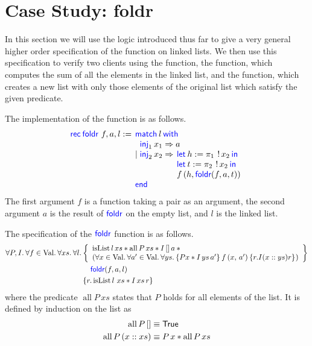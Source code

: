 \section{Case Study: foldr}
\label{sec:case-study:foldr}
In this section we will use the logic introduced thus far to give a very general higher order specification of the  function on linked lists.
We then use this specification to verify two clients using the  function, the  function, which computes the sum of all the elements in the linked list, and the  function, which creates a new list with only those elements of the original list which satisfy the given predicate.

The implementation of the  function is as follows.
\begin{displaymath}
  \Rec{\langkw{foldr}} f, a, l  =
  \MatchML{l}with{\Inj{1} x_1}=>{a}|{\Inj{2} x_2}=>{
    \begin{array}[t]{l} 
      \Let h = \Proj{1} \deref x_2 in\\
      \Let t = \Proj{2} \deref x_2 in\\
      f\, (h, \langkw{foldr} (f, a, t)) \end{array}}end{}
\end{displaymath}
The first argument $f$ is a function taking a pair as an argument, the second argument $a$ is the result of $\textsf{\color{blue} foldr}$ on the empty list, and $l$ is the linked list.

The specification of the $\textsf{\color{blue} foldr}$ function is as follows.
\begin{align*}
\All P, I. \All f \in \Val . \All xs. \All l. \hoareV[t]
{
  \begin{array}{l}
    \operatorname{isList} l\, xs \ast \operatorname{all} P\, xs \ast  I \, [] \, a \ast{}\\
    \left( \All x \in \Val. \All a' \in \Val. \All ys. \hoare{P x \ast I \, ys \, a'}{f \, (x, \, a')}{r. I (x::ys) r} \right)
  \end{array}
  }
{\langkw{foldr}(f, a, l)}
{r.  \operatorname{isList} l \ xs \ast I\, xs\, r}
\end{align*}
where the predicate $\operatorname{all} P\, xs$ states that $P$ holds for all elements of the list.
It is defined by induction on the list as
\begin{align*}
 \operatorname{all} P\, [] &\equiv \textsf{\upshape True} \\
 \operatorname{all} P\, (x::xs) &\equiv P \, x \ast \operatorname{all} P\, xs
\end{align*}

